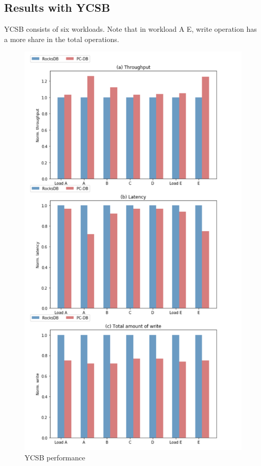 \subsection{Results with YCSB}
YCSB consists of six workloads. Note that in workload A E, write operation has a more share in the total operations.
\begin{figure}
    \centering
    \includegraphics[width=0.36\paperwidth]{figure/YCSB performance.png}
    \caption{YCSB performance }
    \label{fig:YCSB}
\end{figure}
